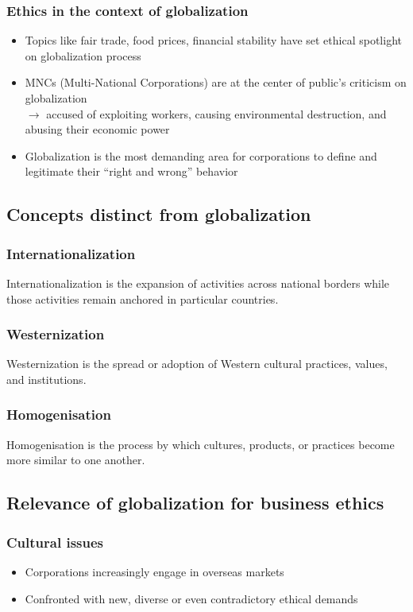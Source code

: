 \documentclass{article}
\begin{document}
\subsubsection{Ethics in the context of globalization}
\begin{itemize}
    \item Topics like fair trade, food prices, financial stability have set ethical spotlight on globalization process
    \item MNCs (Multi-National Corporations) are at the center of public's criticism on globalization\\$\to$ accused of exploiting workers, causing environmental destruction, and abusing their economic power
    \item Globalization is the most demanding area for corporations to define and legitimate their ``right and wrong'' behavior
\end{itemize}

\subsection{Concepts distinct from globalization}
\subsubsection{Internationalization}
Internationalization is the expansion of activities across national borders while those activities remain anchored in particular countries.

\subsubsection{Westernization}
Westernization is the spread or adoption of Western cultural practices, values, and institutions.

\subsubsection{Homogenisation}
Homogenisation is the process by which cultures, products, or practices become more similar to one another.

\subsection{Relevance of globalization for business ethics}
\subsubsection{Cultural issues}
\begin{itemize}
    \item Corporations increasingly engage in overseas markets
    \item Confronted with new, diverse or even contradictory ethical demands
\end{itemize}
\end{document}
